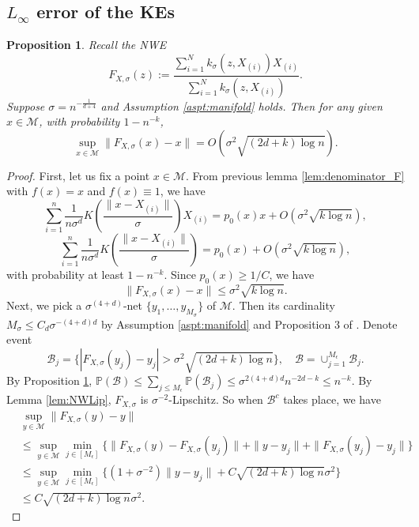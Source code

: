 \documentclass{article}
\newtheorem{pro}[theorem]{Proposition}
\def\Prob{{\mathbb P}}
\def\calM{\mathcal{M}}
\begin{document}
\subsection{$L_\infty$ error of the KEs}
\label{sec:linftyproof}
\begin{pro}
\label{prop:NWonM}
Recall the NWE
\[
F_{X, \sigma}(z) := \frac{\sum\limits_{i=1}^N k_\sigma(z, X_{(i)}) X_{(i)}}{\sum\limits_{i=1}^N k_\sigma(z, X_{(i)})}.
\]
Suppose $\sigma=n^{-\frac{1}{d+4}}$ and
 Assumption \ref{aspt:manifold}  holds.
Then for any given $x\in \calM$, with probability $1-n^{-k}$, 
   \[
\sup_{x\in\calM}\|F_{X,\sigma}(x)- x\| =O(\sigma^2\sqrt{(2d+k)\log n}).
\]
\end{pro}
\begin{proof}
First, let us fix a point $x\in\calM$. From previous lemma \ref{lem:denominator_F} with $f(x)=x$ and $f(x)\equiv 1$, we have
\[
\sum_{i=1}^n \frac{1}{n\sigma^d} K\left( \frac{\|x-X_{(i)}\|}{\sigma} \right) X_{(i)}
= p_0(x) x + O(\sigma^2\sqrt{k\log n}),
\]
\[
\sum_{i=1}^n \frac{1}{n\sigma^d} K\left( \frac{\|x-X_{(i)}\|}{\sigma} \right)
= p_0(x) + O(\sigma^2\sqrt{k\log n}),
\]
with probability at least \(1 - n^{-k}\).
Since $p_0(x)\geq 1/C$, we have 
\[
\|F_{X,\sigma}(x)-x\|\leq \sigma^2 \sqrt{k\log n}. 
\]
Next, we pick a $\sigma^{(4+d)}$-net $\{y_1,\ldots, y_{M_\sigma}\}$ of $\calM$. Then its cardinality $M_{\sigma}\leq C_d\sigma^{-(4+d)d}$ by Assumption \ref{aspt:manifold} and Proposition 3 of \cite{azangulov2024convergence}. Denote event 
\[
\mathcal{B}_j=\{|F_{X,\sigma}(y_j)-y_j|>\sigma^2\sqrt{(2d+k)\log n}\},\quad \mathcal{B}=\cup_{j=1}^{M_\epsilon} \mathcal{B}_j.
\]
By Proposition \ref{prop:NWonM},  $\Prob(\mathcal{B})\leq 
\sum_{j\leq M_\epsilon}\Prob(\mathcal{B}_j)\leq \sigma^{2(4+d)d} n^{-2d-k}\leq n^{-k}$. 
By Lemma \ref{lem:NWLip}, $F_{X,\sigma}$ is $\sigma^{-2}$-Lipschitz. So when $\mathcal{B}^c$ takes place, we have 
\begin{align*}
&\sup_{y\in \calM}\|F_{X,\sigma}(y)-y\|\\
&\leq \sup_{y\in \calM}\min_{j\in [M_\epsilon]}\{\|F_{X,\sigma}(y)-F_{X,\sigma}(y_j)\|+\|y-y_j\|+\|F_{X,\sigma}(y_j)-y_j\|\}\\
&\leq \sup_{y\in \calM}\min_{j\in [M_\epsilon]}\{ (1+\sigma^{-2})\|y-y_j\|+C\sqrt{(2d+k)\log n}\sigma^2\}\\
&\leq C\sqrt{(2d+k)\log n}\sigma^2. 
\end{align*}




\end{proof}
\end{document}

